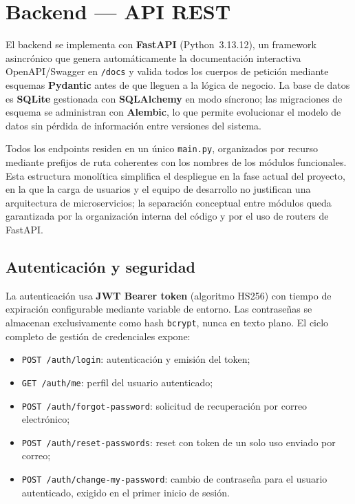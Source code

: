 \section{Backend — API REST}
\label{sec:backend}

El backend se implementa con \textbf{FastAPI} (Python~3.13.12), un framework
asincrónico que genera automáticamente la documentación interactiva
OpenAPI/Swagger en \texttt{/docs} y valida todos los cuerpos de petición
mediante esquemas \textbf{Pydantic} antes de que lleguen a la lógica de
negocio.
La base de datos es \textbf{SQLite} gestionada con \textbf{SQLAlchemy} en
modo síncrono; las migraciones de esquema se administran con
\textbf{Alembic}, lo que permite evolucionar el modelo de datos sin
pérdida de información entre versiones del sistema.

Todos los endpoints residen en un único \texttt{main.py}, organizados por
recurso mediante prefijos de ruta coherentes con los nombres de los
módulos funcionales.
Esta estructura monolítica simplifica el despliegue en la fase actual del
proyecto, en la que la carga de usuarios y el equipo de desarrollo no
justifican una arquitectura de microservicios; la separación conceptual
entre módulos queda garantizada por la organización interna del código y
por el uso de routers de FastAPI.

\subsection{Autenticación y seguridad}

La autenticación usa \textbf{JWT Bearer token} (algoritmo HS256) con
tiempo de expiración configurable mediante variable de entorno.
Las contraseñas se almacenan exclusivamente como hash \texttt{bcrypt},
nunca en texto plano.
El ciclo completo de gestión de credenciales expone:
\begin{itemize}[noitemsep, topsep=2pt]
  \item \texttt{POST /auth/login}: autenticación y emisión del token;
  \item \texttt{GET  /auth/me}: perfil del usuario autenticado;
  \item \texttt{POST /auth/forgot-password}: solicitud de recuperación
    por correo electrónico;
  \item \texttt{POST /auth/reset-passwords}: reset con token de un solo
    uso enviado por correo;
  \item \texttt{POST /auth/change-my-password}: cambio de contraseña
    para el usuario autenticado, exigido en el primer inicio de sesión.
\end{itemize}

